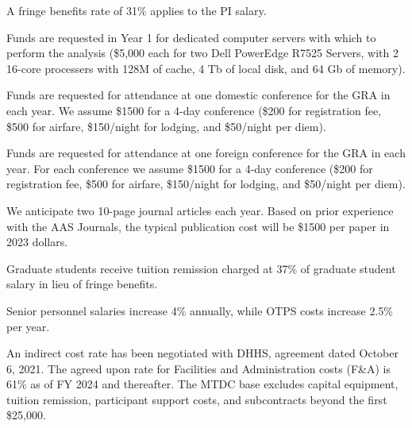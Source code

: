 \documentclass[12pt, preprint]{hacked-aastex}
\begin{document}
 A fringe benefits rate 
of 31\% applies to the PI salary.

 Funds are requested in Year 1 for 
dedicated computer  servers with which to perform the analysis (\$5,000 each
for two Dell PowerEdge R7525 Servers, with 2 16-core processers with 128M 
of cache, 4 Tb of local disk,  and 64 Gb of memory).

 Funds are requested for attendance at
one domestic conference for the GRA in each year. We assume \$1500 for
a 4-day conference (\$200 for registration fee, \$500 for airfare,
\$150/night for lodging, and \$50/night per diem).

 Funds are requested for attendance at
one foreign conference for the GRA in each year. For each conference
we assume \$1500 for a 4-day conference (\$200 for registration fee,
\$500 for airfare, \$150/night for lodging, and \$50/night per diem).

 We anticipate two 10-page journal
articles each year. Based on prior experience with the AAS Journals,
the typical publication cost will be \$1500 per paper in 2023 dollars.

 Graduate students receive tuition
remission charged at 37\% of graduate student salary in lieu of fringe
benefits.

 Senior personnel salaries increase 4\%
annually, while OTPS costs increase 2.5\% per year.

 An indirect cost rate has been
negotiated with DHHS, agreement dated October 6, 2021.  The agreed
upon rate for Facilities and Administration costs (F\&A) is 61\% as of
FY 2024 and thereafter.  The MTDC base excludes capital equipment,
tuition remission, participant support costs, and subcontracts beyond
the first \$25,000.
\end{document}
